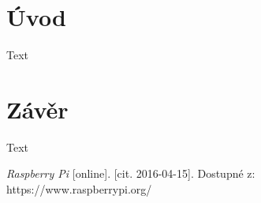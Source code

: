 \documentclass[12pt,a4paper,oneside]{article}
\begin{document}
\section*{Úvod}


Text

\newpage

\section*{Závěr}


Text

\newpage

\begin{thebibliography}{99}

\emph{Raspberry Pi} [online]. [cit. 2016-04-15]. Dostupné z: https://www.raspberrypi.org/

\end{thebibliography}
\end{document}

